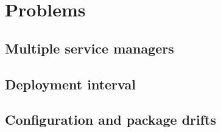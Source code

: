 \section{Problems}

\subsection{Multiple service managers}
\subsection{Deployment interval}
\subsection{Configuration and package drifts}
